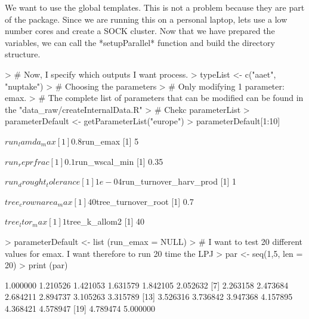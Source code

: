 \documentclass{article}
\begin{document}
We want to use the global templates. This is not a problem because they are part of the package.
Since we are running this on a personal laptop, lets use a low number cores and create a SOCK cluster. Now that we  have prepared the variables, we can call the *setupParallel* function and build the directory structure.


\begin{Schunk}
\begin{Sinput}
> # Now, I specify which outputs I want process.
> typeList <- c("aaet", "nuptake")
> # Choosing the parameters
> # Only modifying 1 parameter: emax.
> # The complete list of parameters that can be modified can be found in the "data_raw/createInternalData.R"
> # Chekc parameterList
> parameterDefault <- getParameterList("europe")
> parameterDefault[1:10]
\end{Sinput}
\begin{Soutput}
$run_lamda_max
[1] 0.8

$run_emax
[1] 5

$run_reprfrac
[1] 0.1

$run_wscal_min
[1] 0.35

$run_drought_tolerance
[1] 1e-04

$run_turnover_harv_prod
[1] 1

$tree_crownarea_max
[1] 40

$tree_turnover_root
[1] 0.7

$tree_ltor_max
[1] 1

$tree_k_allom2
[1] 40
\end{Soutput}
\begin{Sinput}
> parameterDefault <- list (run_emax = NULL)
> # I want to test 20 different values for emax. I want therefore to run 20 time the LPJ
> par <- seq(1,5, len = 20)
> print (par)
\end{Sinput}
\begin{Soutput}
 [1] 1.000000 1.210526 1.421053 1.631579 1.842105 2.052632
 [7] 2.263158 2.473684 2.684211 2.894737 3.105263 3.315789
[13] 3.526316 3.736842 3.947368 4.157895 4.368421 4.578947
[19] 4.789474 5.000000
\end{Soutput}
\end{Schunk}
\end{document}
